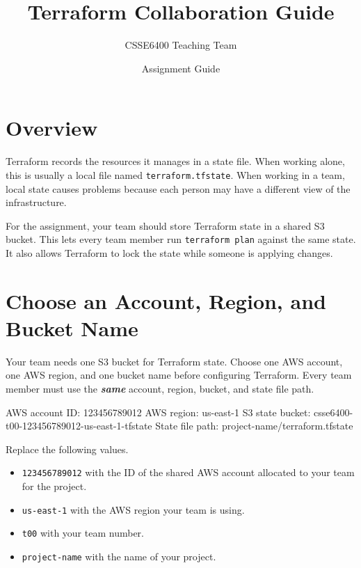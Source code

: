 \documentclass{csse4400}
\title{Terraform Collaboration Guide}
\author{CSSE6400 Teaching Team}
\date{Assignment Guide}
\begin{document}
\maketitle



\section{Overview}

Terraform records the resources it manages in a state file.
When working alone, this is usually a local file named \texttt{terraform.tfstate}.
When working in a team, local state causes problems because each person may have a different view of the infrastructure.

For the assignment, your team should store Terraform state in a shared S3 bucket.
This lets every team member run \texttt{terraform plan} against the same state.
It also allows Terraform to lock the state while someone is applying changes.



\section{Choose an Account, Region, and Bucket Name}

Your team needs one S3 bucket for Terraform state.
Choose one AWS account, one AWS region, and one bucket name before configuring Terraform.
Every team member must use the \textit{\textbf{same}} account, region, bucket, and state file path.

\begin{code}[numbers=none]{}
AWS account ID:   123456789012
AWS region:       us-east-1
S3 state bucket:  csse6400-t00-123456789012-us-east-1-tfstate
State file path:  project-name/terraform.tfstate
\end{code}

\noindent
Replace the following values.
\begin{itemize}[itemsep=2pt,parsep=2pt,topsep=2pt]
  \item \texttt{123456789012} with the ID of the shared AWS account allocated to your team for the project.
  \item \texttt{us-east-1} with the AWS region your team is using.
  \item \texttt{t00} with your team number.
  \item \texttt{project-name} with the name of your project.
\end{itemize}
\end{document}
